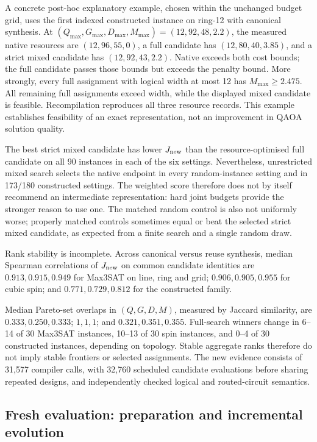 \documentclass[a4paper,onecolumn,11pt,unpublished]{quantumarticle}
\theoremstyle{remark}
\begin{document}
A concrete post-hoc explanatory example, chosen within the unchanged
budget grid, uses the first indexed constructed instance on ring-12 with
canonical synthesis. At $(Q_{\max},G_{\max},D_{\max},M_{\max})
=(12,92,48,2.2)$, the measured native resources are $(12,96,55,0)$,
a full candidate has $(12,80,40,3.85)$, and a strict mixed candidate has
$(12,92,43,2.2)$. Native exceeds both cost bounds; the full candidate
passes those bounds but exceeds the penalty bound. More strongly, every
full assignment with logical width at most 12 has $M_{\max}\ge2.475$.
All remaining full assignments exceed width, while the displayed mixed
candidate is feasible. Recompilation reproduces all three resource records.
This example establishes feasibility of an exact representation, not an
improvement in QAOA solution quality.

The best strict mixed candidate has lower $J_{\rm new}$ than the
resource-optimised full candidate on all 90 instances in each of the six
settings. Nevertheless, unrestricted mixed search selects the native
endpoint in every random-instance setting and in 173/180 constructed
settings. The weighted score therefore does not by itself recommend an
intermediate representation: hard joint budgets provide the stronger
reason to use one. The matched random control is also not uniformly worse;
properly matched controls sometimes equal or beat the selected strict
mixed candidate, as expected from a finite search and a single random draw.

Rank stability is incomplete. Across canonical versus reuse synthesis,
median Spearman correlations of $J_{\rm new}$ on common candidate identities
are $0.913,0.915,0.949$ for Max3SAT on line, ring and grid;
$0.906,0.905,0.955$ for cubic spin; and $0.771,0.729,0.812$ for the
constructed family.

Median Pareto-set overlaps in $(Q,G,D,M)$, measured by Jaccard similarity, are $0.333,0.250,0.333$; $1,1,1$; and
$0.321,0.351,0.355$. Full-search winners change in 6--14 of 30 Max3SAT
instances, 10--13 of 30 spin instances, and 0--4 of 30 constructed
instances, depending on topology. Stable aggregate ranks therefore do not
imply stable frontiers or selected assignments. The new evidence consists
of 31,577 compiler calls, with 32,760 scheduled candidate
evaluations before sharing repeated designs, and independently checked
logical and routed-circuit semantics.

\subsection{Fresh evaluation: preparation and incremental evolution}
\end{document}
